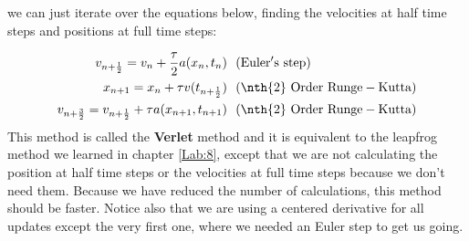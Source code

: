 we can just iterate over the equations below, finding
the velocities at half time steps and positions at full time steps:

\begin{align}
v_{n + {1\over 2}} = v_n + {\tau\over 2} a(x_n,t_n)& ~~\mathrm{(Euler's~ step)}\\
x_{n + 1} = x_n + \tau v(t_{n + {1\over 2}}) &
~~\mathrm{(\nth{2} ~Order~ Runge-Kutta)}\\
v_{n + {3\over 2}} = v_{n+ {1\over 2}} + \tau a(x_{n+ 1},t_{n + 1})& ~~\mathrm{(\nth{2} ~Order~ Runge-Kutta)}\\
\end{align}
This method is called the \textbf{Verlet} method and it is equivalent
to the leapfrog method we learned in chapter \ref{Lab:8}, except that
we are not calculating the position at half time steps or the
velocities at full time steps because we don't need them.  Because we
have reduced the number of calculations, this method should be faster.
Notice also that we are using a centered derivative for all updates
except the very first one, where we needed an Euler step to get us
going.

